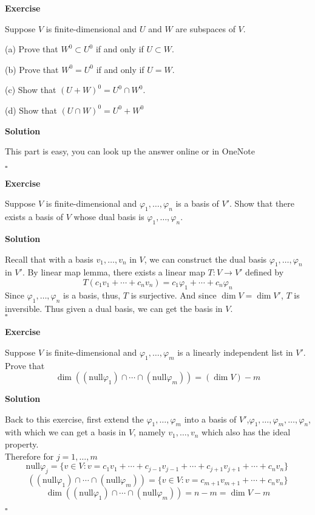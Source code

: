 \documentclass{article}
\newenvironment{exercise}{%
{\textbf{Exercise\\}
    }
}{
}
\newenvironment{solution}{%
{
    \textbf{Solution\\}
    }
}{
  \hfill $\square$ 
  \par\bigskip 
}
\newcommand{\n}{\text{null}}
\begin{document}
\begin{CJK}{UTF8}{gkai}
\begin{exercise}
    Suppose $V$ is finite-dimensional and $U$ and $W$ are subspaces of $V$.

    (a) Prove that $W^0 \subset U^0$ if and only if $U \subset W$.

    (b) Prove that $W^0 = U^0$ if and only if $U = W$.
   
    (c) Show that $(U +W)^0 = U^0 \cap W^0$.

    (d) Show that $(U \cap W)^0 = U^0 +W^0$
\end{exercise}

\begin{solution}
    This part is easy, you can look up the answer online or in OneNote
\end{solution}

\begin{exercise}
    Suppose $V$ is finite-dimensional and $\varphi_1,\ldots,\varphi_n$ is a basis of $V'$. Show that
    there exists a basis of $V$ whose dual basis is $\varphi_1,\ldots,\varphi_n$.
\end{exercise}

\begin{solution}
    Recall that with a basis $v_1,\ldots,v_n$ in $V$, we can construct the dual basis $\varphi_1,\ldots,\varphi_n$ in $V'$. By linear map lemma, there exists a linear map $T : V\to V'$ defined by
    \[T(c_1v_1 + \cdots + c_n v_n) = c_1 \varphi_1 + \cdots + c_n \varphi_n\]
    Since $\varphi_1,\ldots,\varphi_n$ is a basis, thus, $T$ is surjective. And since $\dim V = \dim V'$, $T$ is inversible. Thus given a dual basis, we can get the basis in $V$.\\

\end{solution}

\begin{exercise}
    Suppose $V$ is finite-dimensional and $\varphi_1,\ldots,\varphi_m$ is a linearly independent list in $V'$. Prove that
    \[\dim ((\n\varphi_1) \cap  \cdots \cap (\n\varphi_m)) = (\dim V)-m\]
\end{exercise}

\begin{solution}
    Back to this exercise, first extend the $\varphi_1,\ldots,\varphi_m$ into a basis of $V'$,$\varphi_1,\ldots,\varphi_m,\ldots,\varphi_n$, with which we can get a basis in $V$, namely $v_1,\ldots,v_n$ which also has the ideal property.\\

    Therefore for $ j = 1,\ldots, m$
    \[\n \varphi_j = \{v \in V: v = c_1 v_1 + \cdots + c_{j - 1}v_{j -1 } + \cdots + c_{j + 1}v_{j + 1} + \cdots + c_n v_n \}\,\]
    \[((\n\varphi_1) \cap  \cdots \cap (\n\varphi_m)) =\{v\in V : v =  c_{m + 1} v_{m + 1} + \cdots + c_n v_n\}\]
    \[\dim((\n\varphi_1) \cap  \cdots \cap (\n\varphi_m)) = n - m = \dim V - m\]
\end{solution}


\end{CJK}
\end{document}
